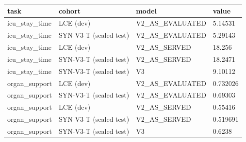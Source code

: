 \begin{tabular}{llll}
\hline
task & cohort & model & value \\
\hline
icu\_stay\_time & LCE (dev) & V2\_AS\_EVALUATED & 5.14531 \\
icu\_stay\_time & SYN-V3-T (sealed test) & V2\_AS\_EVALUATED & 5.29143 \\
icu\_stay\_time & LCE (dev) & V2\_AS\_SERVED & 18.256 \\
icu\_stay\_time & SYN-V3-T (sealed test) & V2\_AS\_SERVED & 18.2471 \\
icu\_stay\_time & SYN-V3-T (sealed test) & V3 & 9.10112 \\
organ\_support & LCE (dev) & V2\_AS\_EVALUATED & 0.732026 \\
organ\_support & SYN-V3-T (sealed test) & V2\_AS\_EVALUATED & 0.69303 \\
organ\_support & LCE (dev) & V2\_AS\_SERVED & 0.55416 \\
organ\_support & SYN-V3-T (sealed test) & V2\_AS\_SERVED & 0.519691 \\
organ\_support & SYN-V3-T (sealed test) & V3 & 0.6238 \\
\hline
\end{tabular}
